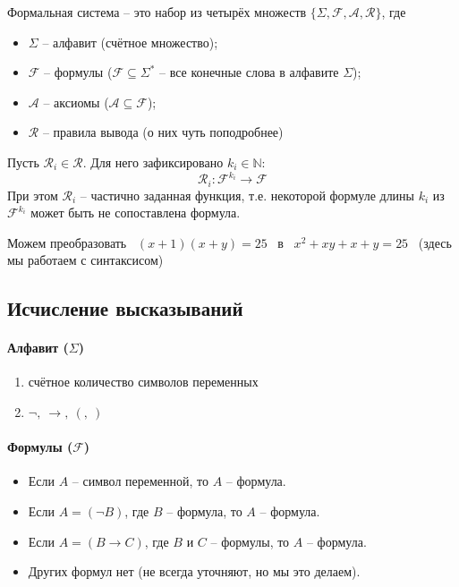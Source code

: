 \documentclass[11pt]{article}
\begin{document}
\begin{definition}
    Формальная система -- это набор из четырёх множеств $\{\Sigma, \mathcal{F}, 
    \mathcal{A}, \mathcal{R}\}$, где \begin{itemize}
        \item $\Sigma$ -- алфавит (счётное множество);
        \item $\mathcal{F}$ -- формулы ($\mathcal{F} \subseteq \Sigma^*$ -- все 
        конечные слова в алфавите $\Sigma$);
        \item $\mathcal{A}$ -- аксиомы ($\mathcal{A} \subseteq \mathcal{F}$);
        \item $\mathcal{R}$ -- правила вывода (о них чуть поподробнее)
    \end{itemize}
    Пусть $\mathcal{R}_i \in \mathcal{R}$. Для него зафиксировано $k_i \in \mathbb{N}:$ 
    \[\mathcal{R}_i \colon \mathcal{F}^{k_i} \to \mathcal{F}\] 
    При этом $\mathcal{R}_i$ -- частично заданная функция, т.е. некоторой формуле 
    длины $k_i$ из $\mathcal{F}^{k_i}$ может быть не сопоставлена формула.
    \begin{example}
        Можем преобразовать \ $(x + 1)(x + y) = 25$ \ в \ $x^2 + xy + x + y = 25$ \ 
        (здесь мы работаем с синтаксисом)
    \end{example}
\end{definition}

\subsection{Исчисление высказываний}

\paragraph{Алфавит ($\Sigma$)} 
\begin{enumerate}
    \item счётное количество символов переменных
    \item $\lnot, \ \to, \ (, \ )$
\end{enumerate}

\paragraph{Формулы ($\mathcal{F}$)}
\begin{itemize}
    \item Если $A$ -- символ переменной, то $A$ -- формула.
    \item Если $A = (\lnot B)$, где $B$ -- формула, то $A$ -- формула.
    \item Если $A = (B \to C)$, где $B$ и $C$ -- формулы, то $A$ -- формула.
    \item Других формул нет (не всегда уточняют, но мы это делаем).
\end{itemize}
\end{document}
